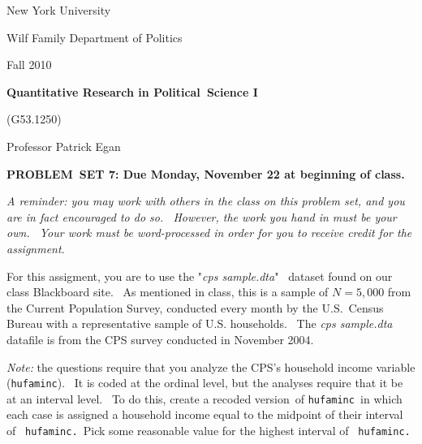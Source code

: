 \documentclass[11pt]{article}
\begin{document}
New York University

Wilf Family Department of Politics

Fall 2010

\begin{center}
{\large \textbf{Quantitative Research in Political\ Science I}}

(G53.1250)

Professor Patrick Egan

\bigskip

\textbf{PROBLEM\ SET 7: Due Monday, November 22 at beginning of class.}
\end{center}

\textit{A reminder: you may work with others in the class on this problem
set, and you are in fact encouraged to do so. \ However, the work you hand
in must be your own. \ Your work must be word-processed in order for you to
receive credit for the assignment.}

\bigskip

For this assigment, you are to use the "\textit{cps sample.dta}"\textit{\ }%
dataset found on our class Blackboard site. \ As mentioned in class, this is
a sample of $N=5,000$ from the Current Population Survey, conducted every
month by the U.S.\ Census Bureau with a representative sample of U.S.
households. \ The \textit{cps sample.dta }datafile is from the CPS survey
conducted in November 2004.\bigskip\ \ 

\textit{Note: }the questions require that you analyze the CPS's household
income variable (\texttt{hufaminc}). \ It is coded at the ordinal level, but
the analyses require that it be at an interval level. \ To do this, create a
recoded version\ of \texttt{hufaminc }in which each case is assigned a
household income equal to the midpoint of their interval of \texttt{%
hufaminc. }Pick some reasonable value for the highest interval of \texttt{%
hufaminc. }\bigskip
\end{document}
